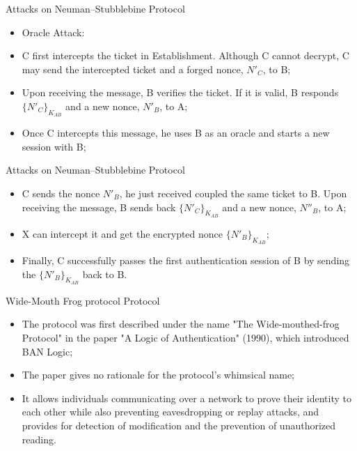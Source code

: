 \documentclass[12pt,table,xcolor={dvipsnames}]{beamer}
\begin{document}
\begin{frame}{Attacks on Neuman–Stubblebine Protocol}
\begin{itemize}
\item Oracle Attack:
\item C first intercepts the ticket in Establishment. Although C cannot decrypt, C may send the intercepted ticket and a forged nonce, $N'_{C}$, to B;\pause
\item Upon receiving the message, B verifies the ticket. If it is valid, B responds $\{N'_{C}\}_{K_{AB}}$ and a new nonce, $N'_{B}$, to A;\pause
\item Once C intercepts this message, he uses B as an oracle and starts a new session with
B;
\end{itemize}
\end{frame}

\begin{frame}{Attacks on Neuman–Stubblebine Protocol}
\begin{itemize}
\item C sends the nonce $N'_{B}$, he just received coupled the same ticket to B. Upon receiving the message, B sends back $\{N'_{C}\}_{K_{AB}}$ and a new nonce, $N''_{B}$, to A;\pause
\item X can intercept it and get the encrypted nonce $\{N'_{B}\}_{K_{AB}}$;\pause
\item Finally, C successfully passes the first authentication session of B by sending the $\{N'_{B}\}_{K_{AB}}$ back to B.
\end{itemize}
\end{frame}

\begin{frame}{Wide-Mouth Frog protocol Protocol}
\begin{itemize}
\item The protocol was first described under the name "The Wide-mouthed-frog Protocol" in the paper "A Logic of Authentication" (1990), which introduced BAN Logic;\pause
\item The paper gives no rationale for the protocol's whimsical name;\pause
\item It allows individuals communicating over a network to prove their identity to each other while also preventing eavesdropping or replay attacks, and provides for detection of modification and the prevention of unauthorized reading.
\end{itemize}
\end{frame}
\end{document}
